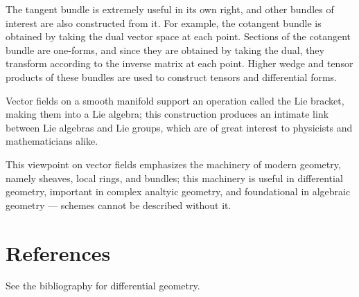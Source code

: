 \documentclass[12pt]{article}
\theoremstyle{remark}
\begin{document}
The tangent bundle is extremely useful in its own right, and other bundles of interest are also constructed from it.  For example, the cotangent bundle is obtained by taking the dual vector space at each point.  Sections of the cotangent bundle are one-forms, and since they are obtained by taking the dual, they transform according to the inverse matrix at each point.  Higher wedge and tensor products of these bundles are used to construct tensors and differential forms.

Vector fields on a smooth manifold support an operation called the Lie bracket, making them into a Lie algebra; this construction produces an intimate link between Lie algebras and Lie groups, which are of great interest to physicists and mathematicians alike.

This viewpoint on vector fields emphasizes the machinery of modern geometry, namely sheaves, local rings, and bundles; this machinery is useful in differential geometry, important in complex analtyic geometry, and foundational in algebraic geometry --- schemes cannot be described without it.

\section*{References}

See the bibliography for differential geometry.
\end{document}
